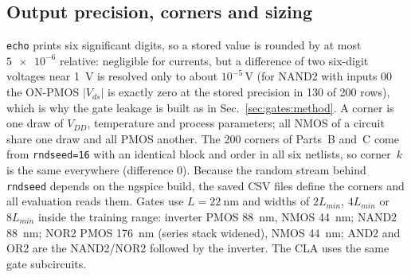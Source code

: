 \subsection{Output precision, corners and sizing}\label{sec:data:corners}
\texttt{echo} prints six significant digits, so a stored value is rounded by at most $\num{5e-6}$ relative: negligible for currents, but a difference of two six-digit voltages near \SI{1}{\volt} is resolved only to about $10^{-5}$\,\si{\volt} (for NAND2 with inputs 00 the ON-PMOS $|V_{ds}|$ is exactly zero at the stored precision in 130 of 200 rows), which is why the gate leakage is built as in Sec.~\ref{sec:gates:method}.
A corner is one draw of $V_{DD}$, temperature and process parameters; all NMOS of a circuit share one draw and all PMOS another. The 200 corners of Parts~B and~C come from \texttt{rndseed=16} with an identical block and order in all six netlists, so corner~$k$ is the same everywhere (difference 0). Because the random stream behind \texttt{rndseed} depends on the ngspice build, the saved CSV files define the corners and all evaluation reads them.
Gates use $L=\SI{22}{\nano\meter}$ and widths of $2L_{min}$, $4L_{min}$ or $8L_{min}$ inside the training range: inverter PMOS \SI{88}{\nano\meter}, NMOS \SI{44}{\nano\meter}; NAND2 \SI{88}{\nano\meter}; NOR2 PMOS \SI{176}{\nano\meter} (series stack widened), NMOS \SI{44}{\nano\meter}; AND2 and OR2 are the NAND2/NOR2 followed by the inverter. The CLA uses the same gate subcircuits.
